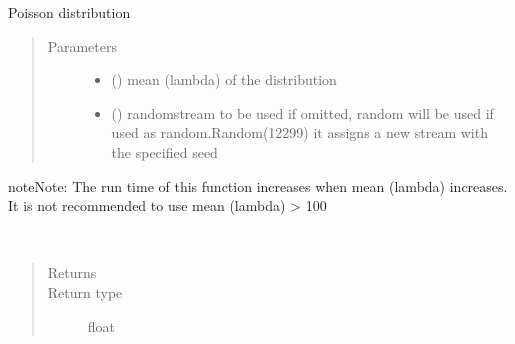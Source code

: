 \documentclass[letterpaper,10pt,english]{sphinxmanual}
\begin{document}
\begin{fulllineitems}
\label{\detokenize{Reference:salabim.Poisson}}
Poisson distribution
\begin{quote}\begin{description}
\item[{Parameters}] \leavevmode\begin{itemize}
\item {} 
 () \textendash{} mean (lambda) of the distribution

\item {} 
 () \textendash{} randomstream to be used 
if omitted, random will be used 
if used as random.Random(12299)
it assigns a new stream with the specified seed

\end{itemize}

\end{description}\end{quote}

\begin{sphinxadmonition}{note}{Note:}
The run time of this function increases when mean (lambda) increases. 
It is not recommended to use mean (lambda) \textgreater{} 100
\end{sphinxadmonition}

\begin{fulllineitems}
\label{\detokenize{Reference:salabim.Poisson.mean}}~\begin{quote}\begin{description}
\item[{Returns}] \leavevmode
{}

\item[{Return type}] \leavevmode
float

\end{description}\end{quote}

\end{fulllineitems}



\end{fulllineitems}
\end{document}
